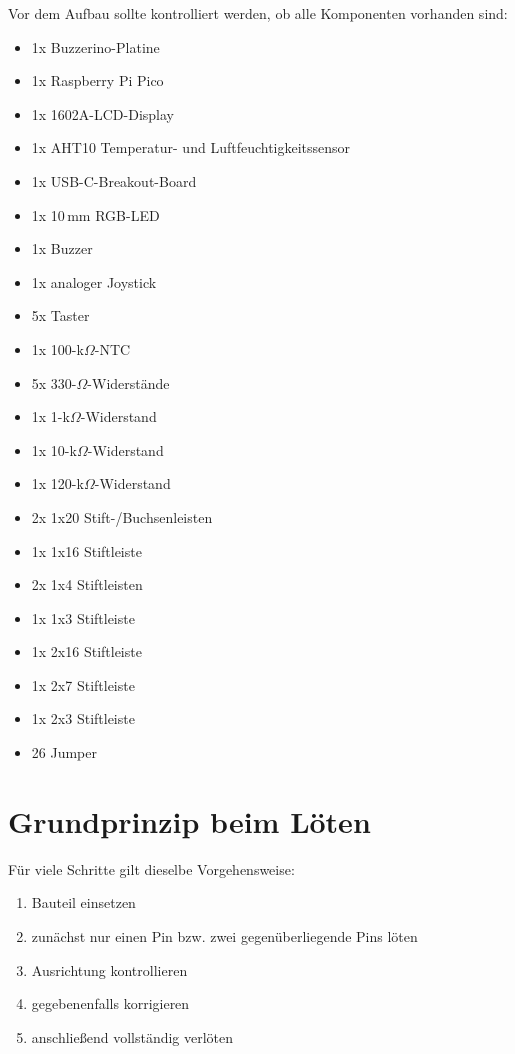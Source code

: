 \documentclass[a4paper,11pt]{article}
\begin{document}
Vor dem Aufbau sollte kontrolliert werden, ob alle Komponenten vorhanden sind:

\begin{itemize}
    \item 1x Buzzerino-Platine
    \item 1x Raspberry Pi Pico
    \item 1x 1602A-LCD-Display
    \item 1x AHT10 Temperatur- und Luftfeuchtigkeitssensor
    \item 1x USB-C-Breakout-Board
    \item 1x 10\,mm RGB-LED
    \item 1x Buzzer
    \item 1x analoger Joystick
    \item 5x Taster
    \item 1x 100-k$\Omega$-NTC
    \item 5x 330-$\Omega$-Widerstände
    \item 1x 1-k$\Omega$-Widerstand
    \item 1x 10-k$\Omega$-Widerstand
    \item 1x 120-k$\Omega$-Widerstand
    \item 2x 1x20 Stift-/Buchsenleisten
    \item 1x 1x16 Stiftleiste
    \item 2x 1x4 Stiftleisten
    \item 1x 1x3 Stiftleiste
    \item 1x 2x16 Stiftleiste
    \item 1x 2x7 Stiftleiste
    \item 1x 2x3 Stiftleiste
    \item 26 Jumper
\end{itemize}

\section*{Grundprinzip beim Löten}

Für viele Schritte gilt dieselbe Vorgehensweise:
\begin{enumerate}
    \item Bauteil einsetzen
    \item zunächst nur einen Pin bzw. zwei gegenüberliegende Pins löten
    \item Ausrichtung kontrollieren
    \item gegebenenfalls korrigieren
    \item anschließend vollständig verlöten
\end{enumerate}
\end{document}
